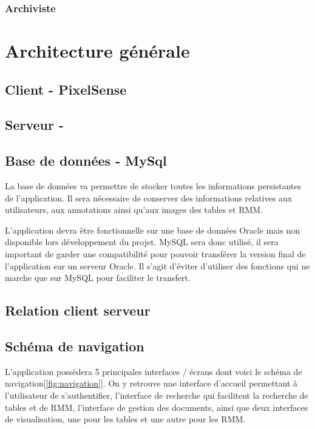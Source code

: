 \documentclass[a4paper]{article}
\begin{document}
\subsubsection{Archiviste}

\section{Architecture générale}
\subsection{Client - PixelSense}
\subsection{Serveur - }
\subsection{Base de données - MySql}
La base de donn\'ees va permettre de stocker toutes les informations persistantes de l'application. Il sera nécessaire de conserver des informations relatives aux utilisateurs, aux annotations ainsi qu'aux images des tables et RMM.

L'application devra \^etre fonctionnelle sur une base de données Oracle mais non disponible lors développement du projet. MySQL sera donc utilisé, il sera important de garder une compatibilité pour pouvoir transférer la version final de l'application sur un serveur Oracle. Il s'agit d'éviter d'utiliser des fonctions qui ne marche que sur MySQL pour faciliter le transfert.
\subsection{Relation client serveur}

\subsection{Schéma de navigation}

L’application possédera 5 principales interfaces / écrans dont voici le schéma de navigation[\ref{fig:navigation}]. On y retrouve une interface d'accueil permettant à l'utilisateur de s'authentifier, l'interface de recherche qui facilitent la recherche de tables et de RMM, l'interface de gestion des documents, ainsi que deux interfaces de visualisation, une pour les tables et une autre pour les RMM.
\end{document}
